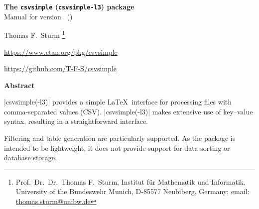 \documentclass[a4paper,11pt]{ltxdoc}
\begin{document}
\begin{center}
\begin{tcolorbox}[enhanced,hbox,tikznode,left=8mm,right=8mm,boxrule=0.4pt,
  colback=white,colframe=black!50!yellow,
  drop lifted shadow=black!50!yellow,arc is angular,
  before=\par\vspace*{5mm},after=\par\bigskip]
{\bfseries\LARGE The \texttt{csvsimple} (\texttt{csvsimple-l3}) package}\\[3mm]
{\large Manual for version \version\ (\datum)}
\end{tcolorbox}
{\large Thomas F.~Sturm%
  \footnote{Prof.~Dr.~Dr.~Thomas F.~Sturm, Institut f\"{u}r Mathematik und Informatik,
    University of the Bundeswehr Munich, D-85577 Neubiberg, Germany;
    email: \href{mailto:thomas.sturm@unibw.de}{thomas.sturm@unibw.de}}\par\medskip
\normalsize\url{https://www.ctan.org/pkg/csvsimple}\par
\url{https://github.com/T-F-S/csvsimple}
}
\end{center}
\bigskip
\begin{absquote}
  \begin{center}\bfseries Abstract\end{center}
  |csvsimple(-l3)| provides a simple \LaTeX\ interface for processing files with
  comma-separated values (CSV).
  |csvsimple(-l3)| makes extensive use of key–value syntax, resulting in a straightforward interface.

  Filtering and table generation are particularly supported. As the package
  is intended to be lightweight, it does not provide support for data sorting or
  database storage.
\end{absquote}

\vspace{1cm}
\end{document}
